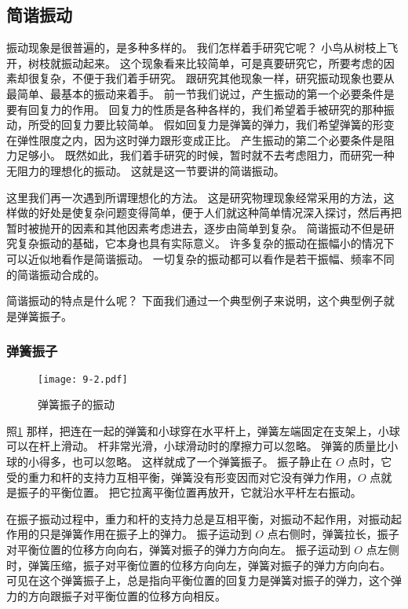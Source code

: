 \subsection{简谐振动}
振动现象是很普遍的，是多种多样的。
我们怎样着手研究它呢？
小鸟从树枝上飞开，树枝就振动起来。
这个现象看来比较简单，可是真要研究它，所要考虑的因素却很复杂，不便于我们着手研究。
跟研究其他现象一样，研究振动现象也要从最简单、最基本的振动来着手。
前一节我们说过，产生振动的第一个必要条件是要有回复力的作用。
回复力的性质是各种各样的，我们希望着手被研究的那种振动，所受的回复力要比较简单。
假如回复力是弹簧的弹力，我们希望弹簧的形变在弹性限度之内，因为这时弹力跟形变成正比。
产生振动的第二个必要条件是阻力足够小。
既然如此，我们着手研究的时候，暂时就不去考虑阻力，而研究一种无阻力的理想化的振动。
这就是这一节要讲的简谐振动。

这里我们再一次遇到所谓理想化的方法。
这是研究物理现象经常采用的方法，这样做的好处是使复杂问题变得简单，便于人们就这种简单情况深入探讨，然后再把暂时被抛开的因素和其他因素考虑进去，逐步由简单到复杂。
简谐振动不但是研究复杂振动的基础，它本身也具有实际意义。
许多复杂的振动在振幅小的情况下可以近似地看作是简谐振动。
一切复杂的振动都可以看作是若干振幅、频率不同的简谐振动合成的。

简谐振动的特点是什么呢？
下面我们通过一个典型例子来说明，这个典型例子就是弹簧振子。

\subsubsection{弹簧振子} 

\begin{figure}
  \texttt{[image: 9-2.pdf]}
  \caption{弹簧振子的振动}\label{fig:9-2}
\end{figure}

照\cref{fig:9-2} 那样，把连在一起的弹簧和小球穿在水平杆上，弹簧左端固定在支架上，小球可以在杆上滑动。
杆非常光滑，小球滑动时的摩擦力可以忽略。
弹簧的质量比小球的小得多，也可以忽略。
这样就成了一个弹簧振子。
振子静止在 $O$ 点时，它受的重力和杆的支持力互相平衡，弹簧没有形变因而对它没有弹力作用，$O$ 点就是振子的平衡位置。
把它拉离平衡位置再放开，它就沿水平杆左右振动。

在振子振动过程中，重力和杆的支持力总是互相平衡，对振动不起作用，对振动起作用的只是弹簧作用在振子上的弹力。
振子运动到 $O$ 点右侧时，弹簧拉长，振子对平衡位置的位移方向向右，弹簧对振子的弹力方向向左。
振子运动到 $O$ 点左侧时，弹簧压缩，振子对平衡位置的位移方向向左，弹簧对振子的弹力方向向右。
可见在这个弹簧振子上，总是指向平衡位置的回复力是弹簧对振子的弹力，这个弹力的方向跟振子对平衡位置的位移方向相反。

